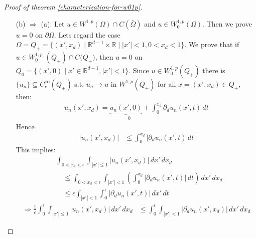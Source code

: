 \documentclass{report}
\theoremstyle{tommy}
\begin{document}
\begin{proof}[Proof of theorem \ref{characterization-for-w01p}]
\begin{itemize}
      \begin{align*}
        \int_\Omega |u_n(x) - u(x)|^p \, dx \to 0
      \end{align*}
      since \(u_n(x) = \frac{1}{n} G(nu(x)) \xrightarrow{n \to \infty} u(x)\) for all \(x \in \Omega\) and \(|u_n(x)| \le \frac{1}{n} |G(nu(x))| \le \frac{1}{n} |nu(x)| \le |u(x)| \in L^p(\Omega)\).
      \begin{align*}
        \int_\Omega|\nabla u_n(x) - \nabla u(x)|^p \, dx 
        &= \int_\Omega |G'(nu(x)) - 1|^p |\nabla u(x)|^p \, dx \to 0
      \end{align*}
      as \(|G'(v(x))-1| \to 0\) for all \(x\) s.t. \(u(x) \ne 0\) and \(\nabla u(x) = 0\) on \(\{x \mid u(x) = 0\}\).  (exercise)
      \item [(b) \(\Rightarrow\) (a):] Let \(u \in W^{1,p}(\Omega) \cap C(\bar \Omega)\) and \(u \in W_0^{1,p}(\Omega)\). Then we prove \(u = 0\) on \(\partial \Omega\). Lets regard the case \(\Omega = Q_+ = \{(x',x_d) \mid \mathbb{R}^{d-1} \times \mathbb{R} \mid |x'|<1, 0 < x_d < 1\}\). 
      We prove that if \(u \in W_0^{1,p} \)
      \((Q_+) \cap C(\overline {Q_+)}\), then \(u = 0\) on \(Q_0 = \{(x', 0) \mid x' \in \mathbb{R}^{d-1}, |x'| < 1\}\). Since \(u \in W_0^{1,p}(Q_+)\) there is \(\{u_n\} \subseteq C_c^\infty(Q_+)\) s.t. \(u_n \to u\) in \(W^{1,p}(Q_+)\) for all \(x = (x', x_d) \in Q_+\), then:
      \begin{align*}
        u_n(x', x_d) = \underbrace{u_n(x', 0)}_{= 0} + \int_0^{x_d} \partial_d u_n(x', t) \, dt
      \end{align*}
      Hence 
      \begin{align*}
        |u_n(x', x_d)| &\le \int_0^{x_d} |\partial_d u_n(x', t) \, dt
      \end{align*}
      This implies:
      \begin{align*}
        &\int_{0 < x_d < \epsilon} \int_{|x'| \le 1} |u_n(x', x_d)| \, dx' \, dx_d \\
        &\quad \le \int_{0 < x_d < \epsilon} \int_{|x'| < 1} \left(\int_0^{x_d}|\partial_d u_n(x', t)| \, dt\right) \, dx' \, dx_d \\
        &\quad \le \epsilon \int_{|x'| < 1} \int_0^\epsilon |\partial_d u_n(x', t)| \, dx' \, dt
      \end{align*}
      \begin{align*}
        \Rightarrow \frac{1}{\epsilon} \int_0^\epsilon \int_{|x'| \le 1} |u_n(x', x_d)| \, dx' \, dx_d 
        &\le \int_0^\epsilon \int_{|x'| < 1} |\partial_d u_n(x', x_d)| \, dx' \, dx_d

\end{align*}
\end{itemize}
\end{proof}
\end{document}

